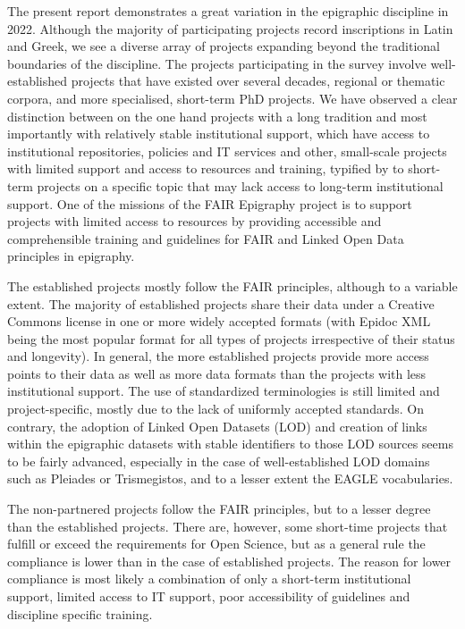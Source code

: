 \documentclass[
  10pt,
]{article}
\begin{document}
The present report demonstrates a great variation in the epigraphic
discipline in 2022. Although the majority of participating projects
record inscriptions in Latin and Greek, we see a diverse array of
projects expanding beyond the traditional boundaries of the discipline.
The projects participating in the survey involve well-established
projects that have existed over several decades, regional or thematic
corpora, and more specialised, short-term PhD projects. We have observed
a clear distinction between on the one hand projects with a long
tradition and most importantly with relatively stable institutional
support, which have access to institutional repositories, policies and
IT services and other, small-scale projects with limited support and
access to resources and training, typified by to short-term projects on
a specific topic that may lack access to long-term institutional
support. One of the missions of the FAIR Epigraphy project is to support
projects with limited access to resources by providing accessible and
comprehensible training and guidelines for FAIR and Linked Open Data
principles in epigraphy.

The established projects mostly follow the FAIR principles, although to
a variable extent. The majority of established projects share their data
under a Creative Commons license in one or more widely accepted formats
(with Epidoc XML being the most popular format for all types of projects
irrespective of their status and longevity). In general, the more
established projects provide more access points to their data as well as
more data formats than the projects with less institutional support. The
use of standardized terminologies is still limited and project-specific,
mostly due to the lack of uniformly accepted standards. On contrary, the
adoption of Linked Open Datasets (LOD) and creation of links within the
epigraphic datasets with stable identifiers to those LOD sources seems
to be fairly advanced, especially in the case of well-established LOD
domains such as Pleiades or Trismegistos, and to a lesser extent the
EAGLE vocabularies.

The non-partnered projects follow the FAIR principles, but to a lesser
degree than the established projects. There are, however, some
short-time projects that fulfill or exceed the requirements for Open
Science, but as a general rule the compliance is lower than in the case
of established projects. The reason for lower compliance is most likely
a combination of only a short-term institutional support, limited access
to IT support, poor accessibility of guidelines and discipline specific
training.
\end{document}
